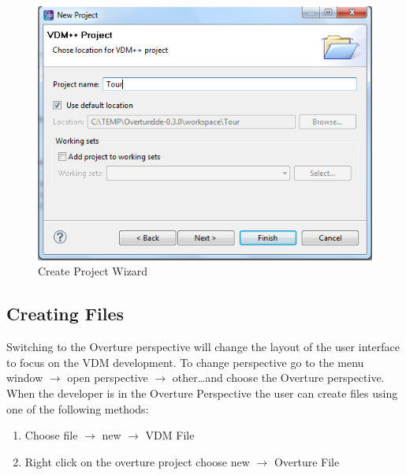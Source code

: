\begin{figure}[!h]
	\begin{center}
	  \includegraphics[scale=0.8]{figures/CreateProjectWizard}
	  \caption[Create Project Wizard]{Create Project Wizard}
	  \label{fig:CreateProjectWizard}
	\end{center}
\end{figure}



\subsection{Creating Files}

Switching to the Overture perspective will change the layout of the user
interface to focus on the VDM development. To change perspective go to the menu 
window $\rightarrow$ open perspective $\rightarrow$ other\ldots and choose the
Overture perspective.
When the developer is in the Overture Perspective the user can create files
using one of the following methods:

\begin{enumerate}
  \item Choose file $\rightarrow$ new $\rightarrow$ VDM File 
  \item Right click on the overture project choose new $\rightarrow$ Overture File 
\end{enumerate}

